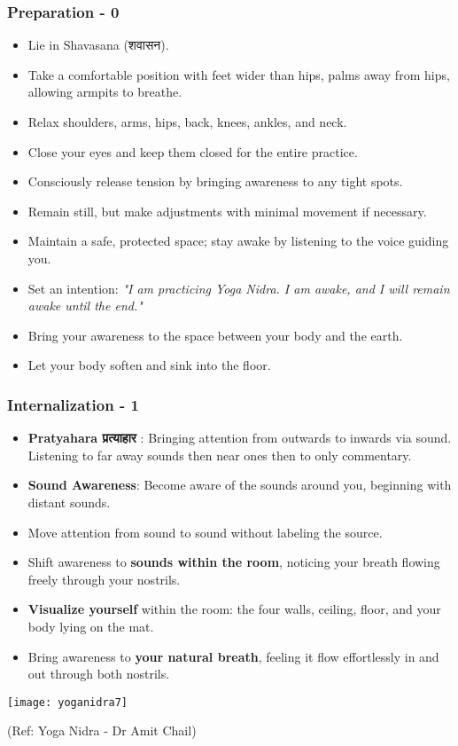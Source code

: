 \begin{frame}[fragile]\frametitle{Preparation - 0}
    \begin{itemize}
        \item Lie in Shavasana (शवासन).
        \item Take a comfortable position with feet wider than hips, palms away from hips, allowing armpits to breathe.
        \item Relax shoulders, arms, hips, back, knees, ankles, and neck.
        \item Close your eyes and keep them closed for the entire practice.
        \item Consciously release tension by bringing awareness to any tight spots.
        \item Remain still, but make adjustments with minimal movement if necessary.
        \item Maintain a safe, protected space; stay awake by listening to the voice guiding you.
        \item Set an intention: \textit{"I am practicing Yoga Nidra. I am awake, and I will remain awake until the end."}
        \item Bring your awareness to the space between your body and the earth.
        \item Let your body soften and sink into the floor.    
	\end{itemize}
	
\end{frame}

\begin{frame}[fragile]\frametitle{Internalization - 1}
    \begin{itemize}
		\item \textbf{Pratyahara प्रत्याहार }: Bringing attention from outwards to inwards via sound. Listening to far away sounds then near ones then to only commentary.
        \item \textbf{Sound Awareness}: Become aware of the sounds around you, beginning with distant sounds. 
        \item Move attention from sound to sound without labeling the source.
        \item Shift awareness to \textbf{sounds within the room}, noticing your breath flowing freely through your nostrils.
        \item \textbf{Visualize yourself} within the room: the four walls, ceiling, floor, and your body lying on the mat.
        \item Bring awareness to \textbf{your natural breath}, feeling it flow effortlessly in and out through both nostrils.
    \end{itemize}
	
      \begin{center}
        \texttt{[image: yoganidra7]}

		{\tiny (Ref: Yoga Nidra - Dr Amit Chail)}		
        \end{center}		
\end{frame}


